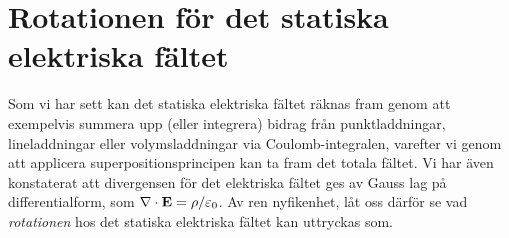 \section{Rotationen f{\"o}r det statiska elektriska f{\"a}ltet}
Som vi har sett kan det statiska elektriska f{\"a}ltet r{\"a}knas fram genom att exempelvis summera upp (eller integrera) bidrag fr{\aa}n punktladdningar, lineladdningar eller volymsladdningar via Coulomb-integralen, varefter vi genom att applicera superpositionsprincipen kan ta fram det totala f{\"a}ltet. Vi har {\"a}ven konstaterat att divergensen f{\"o}r det elektriska f{\"a}ltet ges av Gauss lag p{\aa} differentialform, som $\nabla\cdot{\bf E}=\rho/\varepsilon_0$. Av ren nyfikenhet, l{\aa}t oss d{\"a}rf{\"o}r se vad {\it rotationen} hos det statiska elektriska f{\"a}ltet kan uttryckas som.

